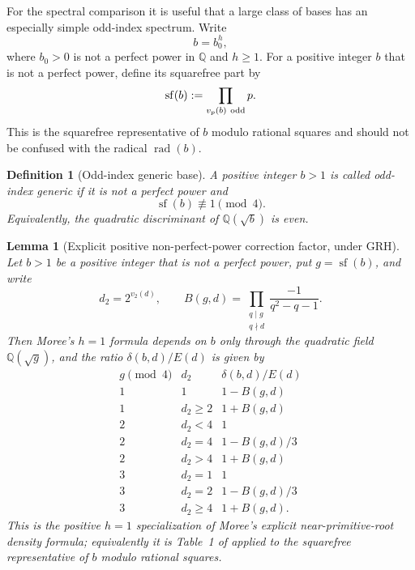 \documentclass[11pt]{article}
\newtheorem{lemma}[theorem]{Lemma}
\newtheorem{definition}[theorem]{Definition}
\newcommand{\rad}{\operatorname{rad}}
\begin{document}
For the spectral comparison it is useful that a large class of bases has an
especially simple odd-index spectrum.  Write
\[
b=b_0^h,
\]
where $b_0>0$ is not a perfect power in $\mathbb Q$ and $h\ge1$.  For a
positive integer $b$ that is not a perfect power, define its squarefree part by
\[
\operatorname{sf}(b):=\prod_{v_p(b)\ {\rm odd}}p.
\]
This is the squarefree representative of $b$ modulo rational squares and
should not be confused with the radical $\rad(b)$.

\begin{definition}[Odd-index generic base]
A positive integer $b>1$ is called \emph{odd-index generic} if it is not a
perfect power and
\[
\operatorname{sf}(b)\not\equiv1\pmod4.
\]
Equivalently, the quadratic discriminant of $\mathbb Q(\sqrt b)$ is even.
\end{definition}

\begin{lemma}[Explicit positive non-perfect-power correction factor, under GRH]
\label{lem:moree-h1-table}
Let $b>1$ be a positive integer that is not a perfect power, put
$g=\operatorname{sf}(b)$, and write
\[
d_2=2^{v_2(d)},
\qquad
B(g,d)=\prod_{\substack{q\mid g\\q\nmid d}}
\frac{-1}{q^2-q-1}.
\]
Then Moree's $h=1$ formula depends on $b$ only through the quadratic field
$\mathbb Q(\sqrt g)$, and the ratio $\delta(b,d)/E(d)$ is given by
\[
\begin{array}{c|c|c}
 g\pmod4 & d_2 & \delta(b,d)/E(d)\\ \hline
 1 & 1 & 1-B(g,d)\\
 1 & d_2\ge2 & 1+B(g,d)\\
 2 & d_2<4 & 1\\
 2 & d_2=4 & 1-B(g,d)/3\\
 2 & d_2>4 & 1+B(g,d)\\
 3 & d_2=1 & 1\\
 3 & d_2=2 & 1-B(g,d)/3\\
 3 & d_2\ge4 & 1+B(g,d).
\end{array}
\]
This is the positive $h=1$ specialization of Moree's explicit
near-primitive-root density formula; equivalently it is Table~1 of
\cite{Moree2013} applied to the squarefree representative of $b$ modulo
rational squares.
\end{lemma}
\end{document}
